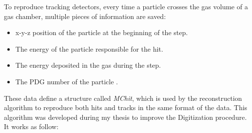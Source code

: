 To reproduce tracking detectors, every time a particle crosses the gas volume of a gas chamber, multiple pieces of information are saved:

\begin{itemize}
\item x-y-z position of the particle at the beginning of the step.
\item The energy of the particle responsible for the hit.  
\item The energy deposited in the gas during the step.
\item The PDG number of the particle \cite{particle-numbering-scheme}.
\end{itemize}

These data define a structure called \textit{MChit}, which is used by the reconstruction algorithm to reproduce both hits and tracks in the same format of the data. This algorithm was developed during my thesis to improve the Digitization procedure. It works as follow:
